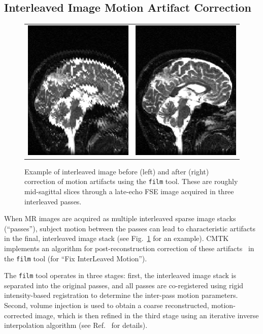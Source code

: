 \documentclass{InsightArticle}
\begin{document}
\subsection{Interleaved Image Motion Artifact Correction}

\begin{figure}[tbp]
\begin{center}
\begin{tabular}{cc}
\includegraphics[width=.3\linewidth]{img/film_artifacts}&
\includegraphics[width=.3\linewidth]{img/film_corrected}
\end{tabular}
\end{center}
\caption{Example of interleaved image before (left) and after (right)
  correction of motion artifacts using the {\tt film} tool. These are roughly
  mid-sagittal slices through a late-echo FSE image acquired in three
  interleaved passes.}
\label{fig:InterleavedExample}
\end{figure}

When MR images are acquired as multiple interleaved sparse image stacks
(``passes''), subject motion between the passes can lead to characteristic
artifacts in the final, interleaved image stack (see
Fig.~\ref{fig:InterleavedExample} for an example). CMTK implements an
algorithm for post-reconstruction correction of these
artifacts~\cite{RohlRadePfef:2008a} in the \verb|film| tool (for ``Fix
InterLeaved Motion'').

The \verb|film| tool operates in three stages: first, the interleaved image
stack is separated into the original passes, and all passes are co-registered
using rigid intensity-based registration to determine the inter-pass motion
parameters. Second, volume injection is used to obtain a coarse reconstructed,
motion-corrected image, which is then refined in the third stage using an
iterative inverse interpolation algorithm (see Ref.~\cite{RohlRadePfef:2008a}
for details).
\end{document}
